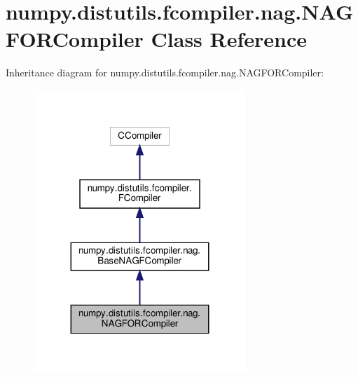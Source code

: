 \hypertarget{classnumpy_1_1distutils_1_1fcompiler_1_1nag_1_1NAGFORCompiler}{}\section{numpy.\+distutils.\+fcompiler.\+nag.\+N\+A\+G\+F\+O\+R\+Compiler Class Reference}
\label{classnumpy_1_1distutils_1_1fcompiler_1_1nag_1_1NAGFORCompiler}


Inheritance diagram for numpy.\+distutils.\+fcompiler.\+nag.\+N\+A\+G\+F\+O\+R\+Compiler\+:
\nopagebreak
\begin{figure}[H]
\begin{center}
\leavevmode
\includegraphics[width=227pt]{classnumpy_1_1distutils_1_1fcompiler_1_1nag_1_1NAGFORCompiler__inherit__graph}
\end{center}
\end{figure}


